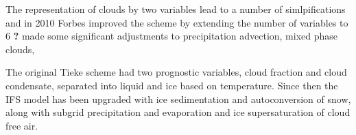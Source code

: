 The representation of clouds by two variables lead to a number of simlpifications and in 2010 Forbes improved the scheme by extending the number of variables to 6 \textbf{?}
  made some significant adjustments to precipitation advection, mixed phase clouds, 


The original Tieke scheme had two prognostic variables, cloud fraction and cloud condensate, separated into liquid and ice based on temperature. Since then the IFS model has been upgraded with ice sedimentation and autoconversion of snow, along with subgrid precipitation and evaporation and ice supersaturation of cloud free air. 

